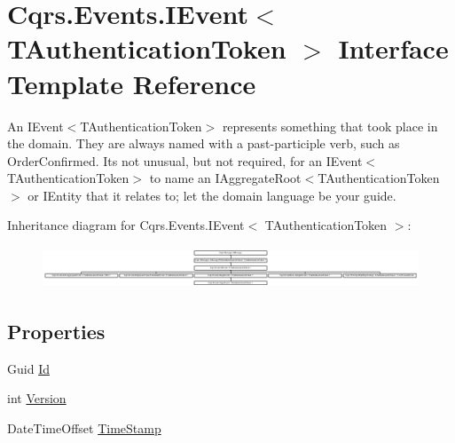 \hypertarget{interfaceCqrs_1_1Events_1_1IEvent}{}\section{Cqrs.\+Events.\+I\+Event$<$ T\+Authentication\+Token $>$ Interface Template Reference}
\label{interfaceCqrs_1_1Events_1_1IEvent}


An I\+Event$<$\+T\+Authentication\+Token$>$ represents something that took place in the domain. They are always named with a past-\/participle verb, such as Order\+Confirmed. It\textquotesingle{}s not unusual, but not required, for an I\+Event$<$\+T\+Authentication\+Token$>$ to name an I\+Aggregate\+Root$<$\+T\+Authentication\+Token$>$ or I\+Entity that it relates to; let the domain language be your guide.  


Inheritance diagram for Cqrs.\+Events.\+I\+Event$<$ T\+Authentication\+Token $>$\+:\begin{figure}[H]
\begin{center}
\leavevmode
\includegraphics[height=1.238938cm]{interfaceCqrs_1_1Events_1_1IEvent}
\end{center}
\end{figure}
\subsection*{Properties}
\begin{DoxyCompactItemize}
\item 
Guid \hyperlink{interfaceCqrs_1_1Events_1_1IEvent_a2974e13d307c62c5cc438d668ff1783b_a2974e13d307c62c5cc438d668ff1783b}{Id}
\item 
int \hyperlink{interfaceCqrs_1_1Events_1_1IEvent_a2754e056f483b9a8e59622a363276b15_a2754e056f483b9a8e59622a363276b15}{Version}
\item 
Date\+Time\+Offset \hyperlink{interfaceCqrs_1_1Events_1_1IEvent_a149d6ea1652cbcc63dbc45eaa71fade0_a149d6ea1652cbcc63dbc45eaa71fade0}{Time\+Stamp}
\end{DoxyCompactItemize}


